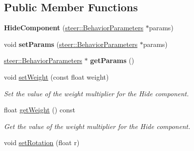 \subsection*{Public Member Functions}
\begin{DoxyCompactItemize}
\item 
\hypertarget{classsteer_1_1_hide_component_a7d52f96991f013560c7d45889d41e2af}{{\bfseries Hide\-Component} (\hyperlink{structsteer_1_1_behavior_parameters}{steer\-::\-Behavior\-Parameters} $\ast$params)}\label{classsteer_1_1_hide_component_a7d52f96991f013560c7d45889d41e2af}

\item 
\hypertarget{classsteer_1_1_hide_component_aab92376692510d75a29e98e6c50e620c}{void {\bfseries set\-Params} (\hyperlink{structsteer_1_1_behavior_parameters}{steer\-::\-Behavior\-Parameters} $\ast$params)}\label{classsteer_1_1_hide_component_aab92376692510d75a29e98e6c50e620c}

\item 
\hypertarget{classsteer_1_1_hide_component_aa120ca55695fcb7ee3b1cc5e0d6f2424}{\hyperlink{structsteer_1_1_behavior_parameters}{steer\-::\-Behavior\-Parameters} $\ast$ {\bfseries get\-Params} ()}\label{classsteer_1_1_hide_component_aa120ca55695fcb7ee3b1cc5e0d6f2424}

\item 
void \hyperlink{classsteer_1_1_hide_component_af268ef8124fd56b3a10bd669f444739b}{set\-Weight} (const float weight)
\begin{DoxyCompactList}\small\item\em Set the value of the weight multiplier for the Hide component. \end{DoxyCompactList}\item 
\hypertarget{classsteer_1_1_hide_component_af319f306a1f3ab0196723e968257015b}{float \hyperlink{classsteer_1_1_hide_component_af319f306a1f3ab0196723e968257015b}{get\-Weight} () const }\label{classsteer_1_1_hide_component_af319f306a1f3ab0196723e968257015b}

\begin{DoxyCompactList}\small\item\em Get the value of the weight multiplier for the Hide component. \end{DoxyCompactList}\item 
\hypertarget{classsteer_1_1_hide_component_a909e034c1a9a89fc65dd184e9bcd3cb1}{void \hyperlink{classsteer_1_1_hide_component_a909e034c1a9a89fc65dd184e9bcd3cb1}{set\-Rotation} (float r)}\label{classsteer_1_1_hide_component_a909e034c1a9a89fc65dd184e9bcd3cb1}


\end{DoxyCompactItemize}
